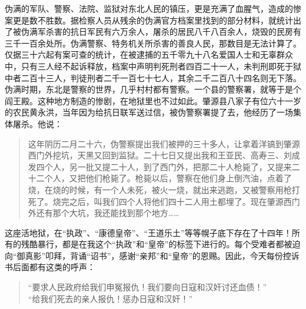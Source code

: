 伪满的军队、警察、法院、监狱对东北人民的镇压，更是充满了血腥气，造成的惨案更是数不胜数。据检察人员从残余的伪满官方档案里找到的部分材料，就统计出了被伪满军杀害的抗日军民有六万余人，屠杀的居民八千八百余人，烧毁的民房有三千一百余处所。伪满警察、特务机关所杀害的善良人民，那数目是无法计算了。仅据三十六起有案可查的统计，在被逮捕的五千零九十八名爱国人士和无辜群众中，只有三人经不起诉释放，档案中声明判死刑者四百二十一人，未判刑即死于狱中者二百十三人，判徒刑者二千一百七十七人，其余二千二百八十四名则无下落。伪满时期，东北是警察的世界，几乎村村都有警察。一个县的警察署，就等于是个阎王殿。这种地方制造的惨剧，在地狱里也不过如此。肇源县八家子有位六十一岁的农民黄永洪，当年因为给抗日联军送过信，被伪警察署提了去，他经历了一场集体屠杀。他说：\\

\begin{quote}
	这年阴历二月二十六，伪警察提出我们被押的三十多人，让拿着洋镐到肇源西门外挖坑，天黑又回到监狱。二十七日又提出我和王亚民、高寿三、刘成发四个人，另一批又提二十人，到了西门外，把那二十人枪毙了，又提来二十二个人，又把他们枪毙了。枪毙以后，警察在他们身上倒汽油，点着了烧，在烧的时候，有一个人未死，被火一烧，就出来逃跑，又被警察用枪打死了。烧完之后，叫我们四个人将他们四十二人用土都埋了。现在肇源西门外还有那个大坑，我还能找到那个地方……\\
\end{quote}

这座活地狱，在“执政”、“康德皇帝”、“王道乐土”等等幌子底下存在了十四年！所有的残酷暴行，都是在我这个“执政”和“皇帝”的标签下进行的。每个受难者都被迫向“御真影”叩拜，背诵“诏书”，感谢“亲邦”和“皇帝”的恩赐。因此，今天每份控诉书后面都有这类的呼声：\\

\begin{quote}
	“要求人民政府给我们申冤报仇！我们要向日寇和汉奸讨还血债！”\\

“给我们死去的亲人报仇！惩办日寇和汉奸！”\\
\end{quote}